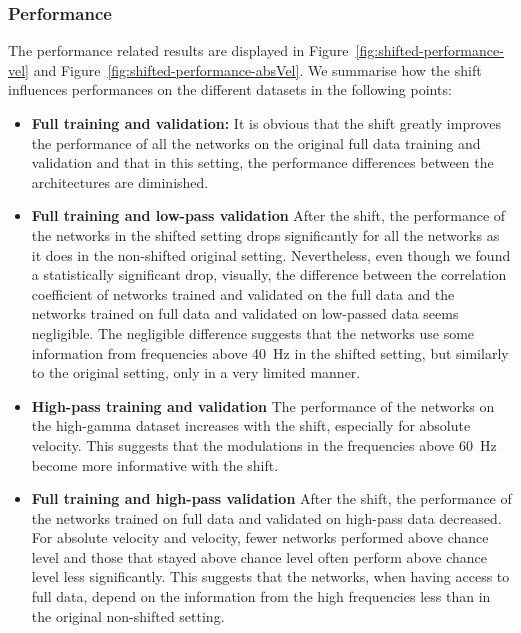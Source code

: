 \subsubsection{Performance}
The performance related results are displayed in Figure~\ref{fig:shifted-performance-vel} and Figure~\ref{fig:shifted-performance-absVel}.
We summarise how the shift influences performances on the different datasets in the following points:
\begin{itemize}
    \item \textbf{Full training and validation:} It is obvious that the shift greatly improves the performance of all the networks on the original full data training and validation and that in this setting, the performance differences between the architectures are diminished.
    
    
    \item \textbf{Full training and low-pass validation} After the shift, the performance of the networks in the shifted setting drops significantly for all the networks as it does in the non-shifted original setting. Nevertheless, even though we found a statistically significant drop, visually, the difference between the correlation coefficient of networks trained and validated on the full data and the networks trained on full data and validated on low-passed data seems negligible. The negligible difference suggests that the networks use some information from frequencies above 40~Hz in the shifted setting, but similarly to the original setting, only in a very limited manner.
    
    \item \textbf{High-pass training and validation} The performance of the networks on the high-gamma dataset increases with the shift, especially for absolute velocity. This suggests that the modulations in the frequencies above 60~Hz become more informative with the shift.
    
    \item \textbf{Full training and high-pass validation} After the shift, the performance of the networks trained on full data and validated on high-pass data decreased. For absolute velocity and velocity, fewer networks performed above chance level and those that stayed above chance level often perform above chance level less significantly. This suggests that the networks, when having access to full data, depend on the information from the high frequencies less than in the original non-shifted setting.

\end{itemize}


